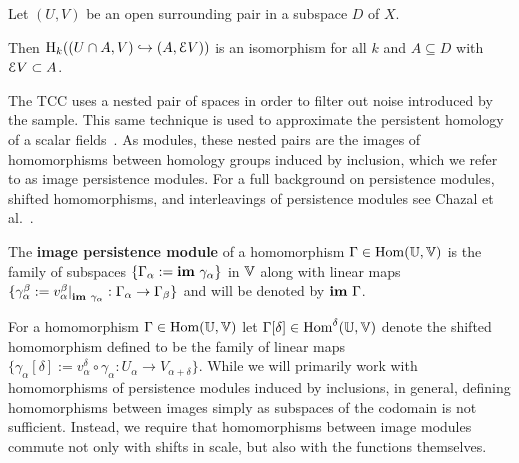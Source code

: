 \begin{lemma}\label{lem:excision}
  Let $(U, V)$ be an open surrounding pair in a subspace $D$ of $X$.

  Then $\mathrm{H}_k((U\cap A, V)\hookrightarrow (A, \mathcal{E} V))$ is an isomorphism for all $k$ and $A\subseteq D$ with $\mathcal{E} V\subset A$.
\end{lemma}

The TCC uses a nested pair of spaces in order to filter out noise introduced by the sample.
This same technique is used to approximate the persistent homology of a scalar fields~\cite{chazal09analysis}.
As modules, these nested pairs are the images of homomorphisms between homology groups induced by inclusion, which we refer to as image persistence modules.
For a full background on persistence modules, shifted homomorphisms, and interleavings of persistence modules see Chazal et al.~\cite{chazal13structure}.

\begin{definition}
  The \textbf{image persistence module} of a homomorphism $\Gamma\in\mathrm{Hom}(\mathbb{U},\mathbb{V})$ is the family of subspaces $\{\Gamma_\alpha :=\mathbf{im}~\gamma_\alpha\}$ in $\mathbb{V}$ along with linear maps $\{\gamma_\alpha^\beta := v_\alpha^\beta\mathord{\mid}_{\mathbf{im}~\gamma_\alpha} : \Gamma_\alpha\to\Gamma_\beta\}$ and will be denoted by $\mathbf{im}~\Gamma$.
\end{definition}

For a homomorphism $\Gamma\in\mathrm{Hom}(\mathbb{U}, \mathbb{V})$ let $\Gamma[\delta]\in \mathrm{Hom}^{\delta}(\mathbb{U}, \mathbb{V})$ denote the shifted homomorphism defined to be the family of linear maps $\{\gamma_\alpha[\delta] := v_\alpha^\delta\circ \gamma_\alpha : U_\alpha\to V_{\alpha+\delta}\}$.
While we will primarily work with homomorphisms of persistence modules induced by inclusions, in general, defining homomorphisms between images simply as subspaces of the codomain is not sufficient.
Instead, we require that homomorphisms between image modules commute not only with shifts in scale, but also with the functions themselves.

